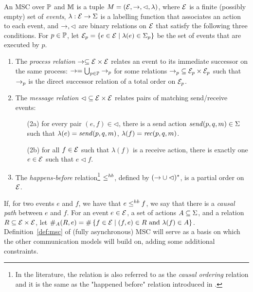 \begin{definition}[MSC]\label{def:msc}
	An {MSC}  over $\mathbb{P}$ and $\mathbb{M}$ is a tuple $M = (\mathcal{E},\to,\lhd,\lambda)$, where 
	$\mathcal{E}$ is a finite (possibly empty) set of \emph{events}, $\lambda: \mathcal{E} \to \Sigma$ is a labelling 
	function that associates an action to each event,
	and $\to,\lhd$ are binary relations on $\mathcal{E}$ that satisfy the following three conditions.
	For $p \in \mathbb{P}$, let $\mathcal{E}_p = \{e \in \mathcal{E} \mid \lambda(e) \in \Sigma_{p}\}$ be 
	the set of events that are executed by $p$. 
	\begin{enumerate}
		\item The \emph{process relation} $\to\subseteq \mathcal{E} \times \mathcal{E}$ 
		relates an event to its immediate successor on
		the same process:
		$\to=\bigcup_{p \in \mathbb{P}} \to_p$ for some 
		relations ${\to_p} \subseteq \mathcal{E}_p \times \mathcal{E}_p$ such that $\to_p$ is 
		the direct successor relation of a total order on $\mathcal{E}_p$.  
		\item The \emph{message relation} ${\lhd} \subseteq \mathcal{E} \times \mathcal{E}$ 
		relates pairs of matching send/receive events: 	
		\begin{enumerate}%
			\item[(2a)] for every pair $(e,f) \in {\lhd}$, there is a send action $\mathit{send}(p, q, m) \in \Sigma$ such that $\lambda(e) = \mathit{send}(p, q, m)$, $\lambda(f) = \mathit{rec}(p, q, m)$.
			\item[(2b)] for all $f \in \mathcal{E}$ such that $\lambda(f)$ is a receive action, there is exactly one $e \in \mathcal{E}$ such that $e \lhd f$.
		\end{enumerate}
		\item The \emph{happens-before} relation\footnote{In the literature, the relation is also referred to as the \emph{causal ordering} relation and 
		it is the same as the "happened before" relation introduced in \cite{Lamport78}.} ${\leq^{hb}}$, defined by $({\to} \cup {\lhd})^\ast$,
		is a partial order on $\mathcal{E}$.
	\end{enumerate}
\end{definition}

 If, for two events $e$ and $f$, we have that $e \leq^{hb} f$, we   say that there is a \emph{causal path} between $e$ and $f$.
For an event $e \in \mathcal{E}$, a set of actions $A \subseteq \Sigma$, and a relation $R \subseteq \mathcal{E} \times \mathcal{E}$,
let $\sametype{e}{A}{\rel} = \cardinalof{\{f \in \Events \mid (f,e) \in \rel$ and $\lambda(f) \in A\}}$.
Definition~\ref{def:msc} of (fully asynchronous) MSC will serve as a basis on which the other communication models will build on, adding some additional constraints.

